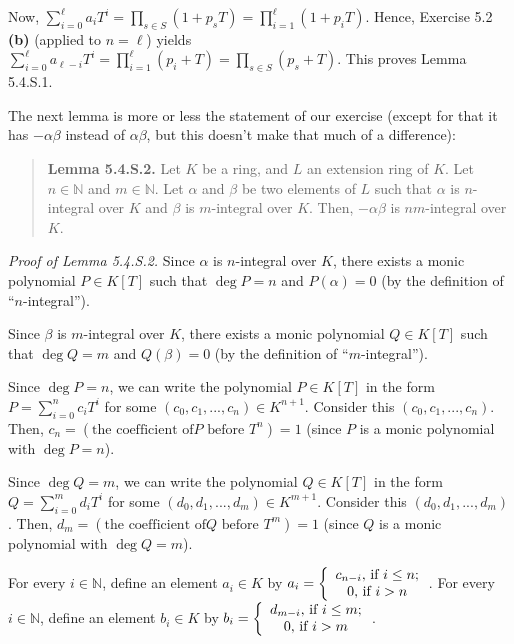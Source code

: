 \documentclass[numbers=enddot,12pt,final,onecolumn,notitlepage]{scrartcl}%
\begin{document}
Now, $\sum\limits_{i=0}^{\ell}a_{i}T^{i}=\prod\limits_{s\in S}\left(
1+p_{s}T\right)  =\prod\limits_{i=1}^{\ell}\left(  1+p_{i}T\right)  $. Hence,
Exercise 5.2 \textbf{(b)} (applied to $n=\ell$) yields $\sum\limits_{i=0}%
^{\ell}a_{\ell-i}T^{i}=\prod\limits_{i=1}^{\ell}\left(  p_{i}+T\right)
=\prod\limits_{s\in S}\left(  p_{s}+T\right)  $. This proves Lemma 5.4.S.1.

The next lemma is more or less the statement of our exercise (except for that
it has $-\alpha\beta$ instead of $\alpha\beta$, but this doesn't make that
much of a difference):

\begin{quote}
\textbf{Lemma 5.4.S.2.} Let $K$ be a ring, and $L$ an extension ring of $K$.
Let $n\in\mathbb{N}$ and $m\in\mathbb{N}$. Let $\alpha$ and $\beta$ be two
elements of $L$ such that $\alpha$ is $n$-integral over $K$ and $\beta$ is
$m$-integral over $K$. Then, $-\alpha\beta$ is $nm$-integral over $K$.
\end{quote}

\textit{Proof of Lemma 5.4.S.2.} Since $\alpha$ is $n$-integral over $K$,
there exists a monic polynomial $P\in K\left[  T\right]  $ such that $\deg
P=n$ and $P\left(  \alpha\right)  =0$ (by the definition of ``$n$-integral'').

Since $\beta$ is $m$-integral over $K$, there exists a monic polynomial $Q\in
K\left[  T\right]  $ such that $\deg Q=m$ and $Q\left(  \beta\right)  =0$ (by
the definition of ``$m$-integral'').

Since $\deg P=n$, we can write the polynomial $P\in K\left[  T\right]  $ in
the form $P=\sum\limits_{i=0}^{n}c_{i}T^{i}$ for some $\left(  c_{0}%
,c_{1},...,c_{n}\right)  \in K^{n+1}$. Consider this $\left(  c_{0}%
,c_{1},...,c_{n}\right)  $. Then, $c_{n}=\left(  \text{the coefficient of
}P\text{ before }T^{n}\right)  =1$ (since $P$ is a monic polynomial with $\deg
P=n$).

Since $\deg Q=m$, we can write the polynomial $Q\in K\left[  T\right]  $ in
the form $Q=\sum\limits_{i=0}^{m}d_{i}T^{i}$ for some $\left(  d_{0}%
,d_{1},...,d_{m}\right)  \in K^{m+1}$. Consider this $\left(  d_{0}%
,d_{1},...,d_{m}\right)  $. Then, $d_{m}=\left(  \text{the coefficient of
}Q\text{ before }T^{m}\right)  =1$ (since $Q$ is a monic polynomial with $\deg
Q=m$).

For every $i\in\mathbb{N}$, define an element $a_{i}\in K$ by $a_{i}=\left\{
\begin{array}
[c]{c}%
c_{n-i}\text{, if }i\leq n;\\
0\text{, if }i>n
\end{array}
\right.  $. For every $i\in\mathbb{N}$, define an element $b_{i}\in K$ by
$b_{i}=\left\{
\begin{array}
[c]{c}%
d_{m-i}\text{, if }i\leq m;\\
0\text{, if }i>m
\end{array}
\right.  $.
\end{document}
